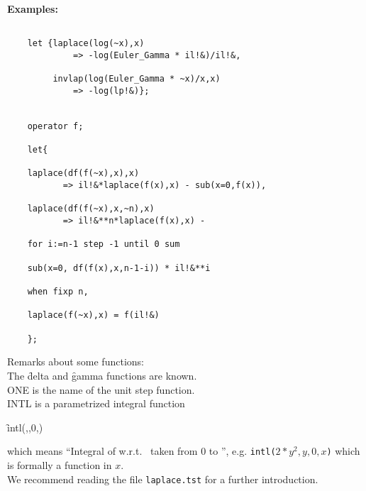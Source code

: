 \pagebreak
\textbf{Examples:}
\begin{verbatim}

    let {laplace(log(~x),x)
             => -log(Euler_Gamma * il!&)/il!&,

         invlap(log(Euler_Gamma * ~x)/x,x) 
             => -log(lp!&)};


    operator f;

    let{

    laplace(df(f(~x),x),x)
           => il!&*laplace(f(x),x) - sub(x=0,f(x)),

    laplace(df(f(~x),x,~n),x)
           => il!&**n*laplace(f(x),x) -

    for i:=n-1 step -1 until 0 sum

    sub(x=0, df(f(x),x,n-1-i)) * il!&**i

    when fixp n,

    laplace(f(~x),x) = f(il!&)

    };

\end{verbatim}


Remarks about some functions: \\[\baselineskip]
The \f{delta} and \f{gamma} functions are known. \\
ONE is the name of the unit step function. \\
INTL is a parametrized integral function
\begin{syntax}
\f{intl}(,,0,)
\end{syntax}
which means ``Integral of  w.r.t.~ taken from 0 to '',
e.g. \texttt{intl($2{*}y^2,y,0,x$)} which is formally a function in $x$.\\
We recommend reading the file \texttt{laplace.tst} for a further introduction.

